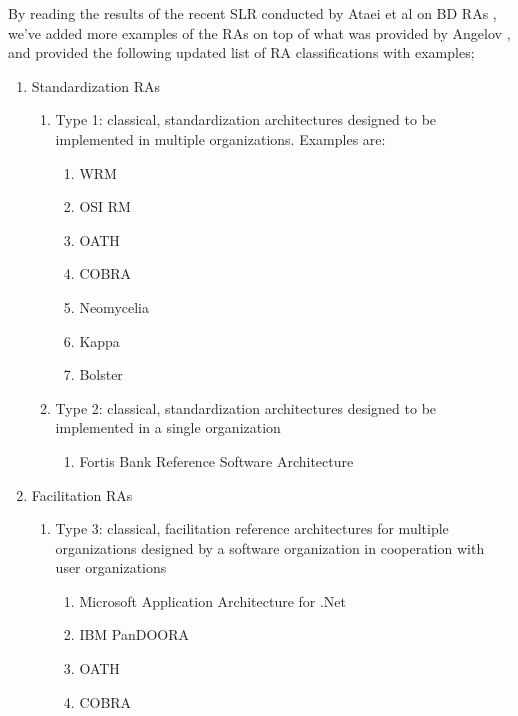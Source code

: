 \documentclass[review]{elsarticle}
\begin{document}
By reading the results of the recent SLR conducted by Ataei et al on BD RAs \cite{AtaeiACIS}, we've added more examples of the RAs on top of what was provided by Angelov \cite{angelov2009classification}, and provided the following updated list of RA classifications with examples;

\begin{enumerate}

    \item Standardization RAs
    
    \begin{enumerate}
      \item Type 1: classical, standardization architectures designed to be implemented in multiple organizations. Examples are: 
      
      \begin{enumerate}
        \item WRM \cite{hollingsworth1995workflow}
        \item OSI RM \cite{zimmermann1980osi}
        \item OATH \cite{OATH}
        \item COBRA \cite{pope1998corba}
        \item Neomycelia \cite{AtaeiApsec}
        \item Kappa \cite{kreps2014questioning}
        \item Bolster \cite{Nadal}
      \end{enumerate}

      \item Type 2: classical, standardization architectures designed to be implemented in a single organization 
      \begin{enumerate}
          \item Fortis Bank Reference Software Architecture \cite{angelov}
      \end{enumerate}
    \end{enumerate}

    \item Facilitation  RAs
    \begin{enumerate}   
        \item Type 3: classical, facilitation reference architectures for multiple organizations designed by a software organization in cooperation with user organizations
        \begin{enumerate}
            \item Microsoft Application Architecture for .Net  \cite{microsoft2002application}
            \item IBM PanDOORA
            \item OATH \cite{OATH}
            \item COBRA \cite{pope1998corba}
        \end{enumerate}


\end{enumerate}
\end{enumerate}
\end{document}
